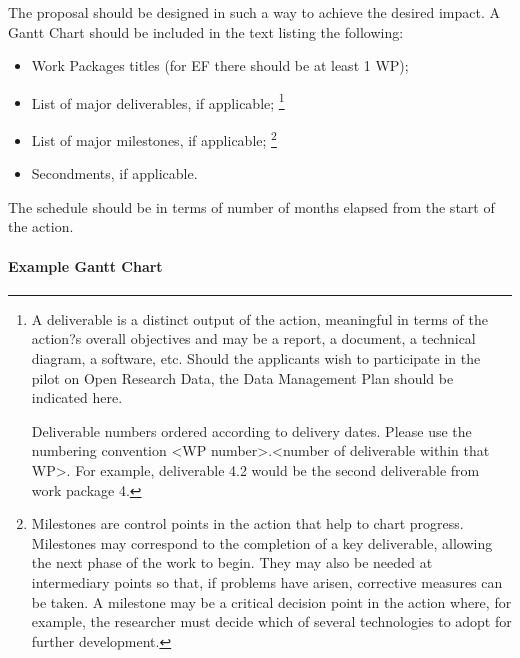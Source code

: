 \documentclass[a4paper,11pt]{article}
\begin{document}
The proposal should be designed in such a way to achieve the desired impact. A Gantt Chart should be included in the text listing the following:

\begin{itemize}
\item Work Packages titles (for EF there should be at least 1 WP); 
\item List of major deliverables, if applicable; \footnote{A deliverable is a distinct output of the action, meaningful in terms of the action?s overall objectives and may be a report, a document, a technical diagram, a software, etc. Should the applicants wish to participate in the pilot on Open Research Data, the Data Management Plan should be indicated here.

Deliverable numbers ordered according to delivery dates. Please use the numbering convention <WP number>.<number of deliverable within that WP>. For example, deliverable 4.2 would be the second deliverable from work package 4.}
\item List of major milestones, if applicable; \footnote{Milestones are control points in the action that help to chart progress. Milestones may correspond to the completion of a key deliverable, allowing the next phase of the work to begin. They may also be needed at intermediary points so that, if problems have arisen, corrective measures can be taken. A milestone may be a critical decision point in the action where, for example, the researcher must decide which of several technologies to adopt for further development.}
\item Secondments, if applicable.
\end{itemize}


The schedule should be in terms of number of months elapsed from the start of the action.


\paragraph{Example Gantt Chart}
\end{document}
